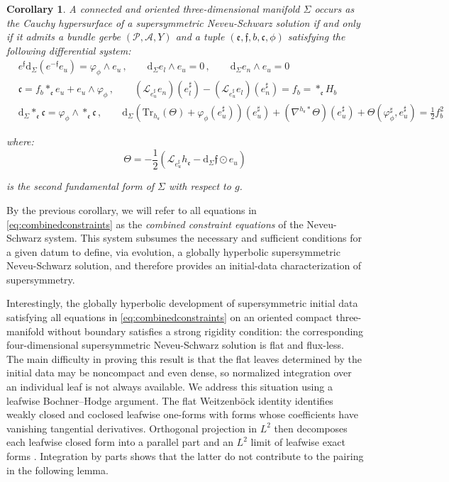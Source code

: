 \documentclass[10pt,reqno,a4paper]{amsart}
\theoremstyle{plain}
\newtheorem{cor}[thm]{Corollary}
\theoremstyle{definition}
\theoremstyle{remark}
\theoremstyle{remark}
\def\dd{\mathrm{d}}
\newcommand{\Tr}{\mathrm{Tr}}
\def\cA{\mathcal{A}}
\def\cP{\mathcal{P}}
\def\cL{\mathcal{L}}
\def\frc{\mathfrak{c}}
\def\cL{\mathcal{L}}
\def\fre{\mathfrak{e}}
\renewcommand{\(}{ (}
\renewcommand{\)}{ )}
\newcommand{\frf}{\mathfrak{f}}
\begin{document}
\begin{cor}
\label{cor:NSNSsusyinitialdataII}
A connected and oriented three-dimensional manifold $\Sigma$ occurs as the Cauchy hypersurface of a supersymmetric Neveu-Schwarz solution if and only if it admits a bundle gerbe $(\cP,\cA,Y)$ and a tuple $(\fre,\frf,b,\frc,\phi)$  satisfying the following differential system:
\begin{eqnarray} 
 & e^{\frf} \dd_\Sigma(e^{-\frf}e_{u}) = \varphi_{\phi}\wedge e_{u}\, , \qquad   \dd_\Sigma e_{l}\wedge e_{u} = 0\, ,
 \qquad \dd_\Sigma e_{n}\wedge e_{u}=0\nonumber \\ 
& \frc = f_{b}\ast_{\fre} e_{u} + e_{u}\wedge\varphi_{\phi}\, , \qquad (\cL_{e^{\sharp}_{u}}e_{n})(e^{\sharp}_{l}) -(\cL_{e^{\sharp}_{u}}e_{l})(e^{\sharp}_{n}) = f_{b} = \ast_{\fre}H_b \label{eq:combinedconstraints}\\
& \dd_{\Sigma}\ast_{\fre}\frc = \varphi_{\phi}\wedge\ast_{\fre}\frc\, , \qquad  \dd_{\Sigma} (\Tr_{h_{\fre}}(\Theta) + \varphi_{\phi}(e^{\sharp}_u) )(e^{\sharp}_u) + (\nabla^{h_{\fre}\ast}\Theta)(e^{\sharp}_u) + \Theta(\varphi_{\phi}^{\sharp},e^{\sharp}_u) = \frac{1}{2} f_b^2\nonumber
\end{eqnarray}

\noindent
where:
\begin{equation*}
\Theta = -\frac{1}{2}(\cL_{e^{\sharp}_u}h_{\fre} - \dd_{\Sigma}\frf\odot e_u)    
\end{equation*}

\noindent
is the second fundamental form of $\Sigma$ with respect to $g$.  
\end{cor}

\noindent
By the previous corollary, we will refer to all equations in \eqref{eq:combinedconstraints} as the \emph{combined constraint equations} of the Neveu-Schwarz system. This system subsumes the necessary and sufficient conditions for a given datum to define, via evolution, a globally hyperbolic supersymmetric Neveu-Schwarz solution, and therefore provides an initial-data characterization of supersymmetry. \medskip

\noindent
Interestingly, the globally hyperbolic development of supersymmetric initial data satisfying all equations in \eqref{eq:combinedconstraints} on an oriented compact three-manifold without boundary satisfies a strong rigidity condition: the corresponding four-dimensional supersymmetric Neveu-Schwarz solution is flat and flux-less. The main difficulty in proving this result is that the flat leaves determined by the initial data may be noncompact and even dense, so normalized integration over an individual leaf is not always available. We address this situation using a leafwise Bochner--Hodge argument. The flat Weitzenböck identity identifies weakly closed and coclosed leafwise one-forms with forms whose coefficients have vanishing tangential derivatives. Orthogonal projection in $L^2$ then decomposes each leafwise closed form into a parallel part and an $L^2$ limit of leafwise exact forms \cite{AlvarezLopezTondeur,BruningLesch}. Integration by parts shows that the latter do not contribute to the pairing in the following lemma.  \medskip
\end{document}
